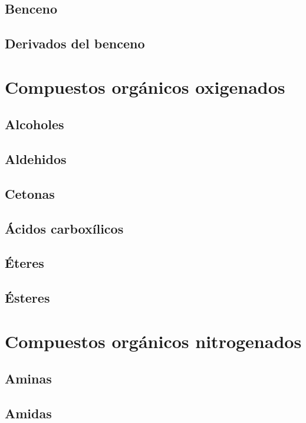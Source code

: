 \documentclass{../summarie}
\begin{document}
    \chapter{Benceno}
    \chapter{Derivados del benceno}

\part{Compuestos orgánicos oxigenados}
    \chapter{Alcoholes}
    \chapter{Aldehidos}
    \chapter{Cetonas}
    \chapter{Ácidos carboxílicos}
    \chapter{Éteres}
    \chapter{Ésteres}

\part{Compuestos orgánicos nitrogenados}
    \chapter{Aminas}
    \chapter{Amidas}


\newpage 
\end{document}
